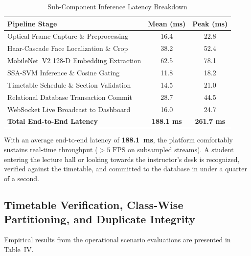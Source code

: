 \documentclass[conference]{IEEEtran}
\begin{document}
\begin{table}[htbp]
\caption{Sub-Component Inference Latency Breakdown}
\begin{center}
\begin{tabular}{lcc}
\toprule
\textbf{Pipeline Stage} & \textbf{Mean (ms)} & \textbf{Peak (ms)} \\
\midrule
Optical Frame Capture \& Preprocessing     & 16.4 & 22.8 \\
Haar-Cascade Face Localization \& Crop    & 38.2 & 52.4 \\
MobileNet~V2 128-D Embedding Extraction   & 62.5 & 78.1 \\
SSA-SVM Inference \& Cosine Gating        & 11.8 & 18.2 \\
Timetable Schedule \& Section Validation  & 14.5 & 21.0 \\
Relational Database Transaction Commit    & 28.7 & 44.5 \\
WebSocket Live Broadcast to Dashboard     & 16.0 & 24.7 \\
\midrule
\textbf{Total End-to-End Latency}         & \textbf{188.1 ms} & \textbf{261.7 ms} \\
\bottomrule
\end{tabular}
\end{center}
\end{table}

With an average end-to-end latency of \textbf{188.1~ms}, the platform comfortably sustains real-time throughput ($>5\text{ FPS}$ on subsampled streams). A student entering the lecture hall or looking towards the instructor's desk is recognized, verified against the timetable, and committed to the database in under a quarter of a second.

\subsection{Timetable Verification, Class-Wise Partitioning, and Duplicate Integrity}
Empirical results from the operational scenario evaluations are presented in Table~IV.
\end{document}
